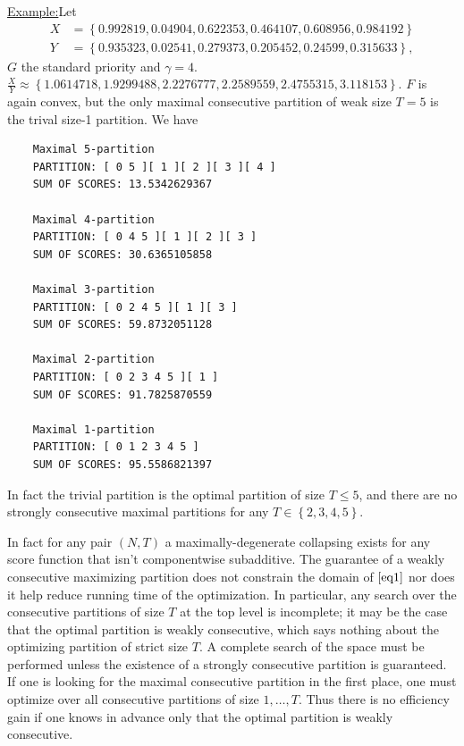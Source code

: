 \documentclass{article}
\theoremstyle{case}
\newenvironment{example}[1]{\par\noindent\underline{Example:}\space#1}{}
\begin{document}
\begin{example}
Let 
\begin{align*}
X & = \left\lbrace 0.992819, 0.04904, 0.622353, 0.464107, 0.608956, 0.984192 \right\rbrace \\
Y & = \left\lbrace 0.935323, 0.02541, 0.279373, 0.205452, 0.24599, 0.315633 \right\rbrace,
\end{align*}
$G$ the standard priority and $\gamma = 4$. $\frac{X}{Y} \approx \left\lbrace 1.0614718, 1.9299488, 2.2276777, 2.2589559, 2.4755315, 3.118153 \right\rbrace$. $F$ is again convex, but the only maximal consecutive partition of weak size $T = 5$ is the trival size-1 partition. We have

\begin{verbatim}
    Maximal 5-partition
    PARTITION: [ 0 5 ][ 1 ][ 2 ][ 3 ][ 4 ]
    SUM OF SCORES: 13.5342629367

    Maximal 4-partition
    PARTITION: [ 0 4 5 ][ 1 ][ 2 ][ 3 ]
    SUM OF SCORES: 30.6365105858

    Maximal 3-partition
    PARTITION: [ 0 2 4 5 ][ 1 ][ 3 ]
    SUM OF SCORES: 59.8732051128

    Maximal 2-partition
    PARTITION: [ 0 2 3 4 5 ][ 1 ]
    SUM OF SCORES: 91.7825870559

    Maximal 1-partition
    PARTITION: [ 0 1 2 3 4 5 ]
    SUM OF SCORES: 95.5586821397
\end{verbatim}
In fact the trivial partition is the optimal partition of size $T \leq 5$, and there are no strongly consecutive maximal partitions for any $T \in \left\lbrace 2, 3, 4, 5\right\rbrace$.

\end{example}
In fact for any pair $\left( N, T\right)$ a maximally-degenerate collapsing exists for any score function that isn't componentwise subadditive. The guarantee of a weakly consecutive maximizing partition does not constrain the domain of $\cite{eq1}$ nor does it help reduce running time of the optimization. In particular, any search over the consecutive partitions of size $T$ at the top level is incomplete; it may be the case that the optimal partition is weakly consecutive, which says nothing about the optimizing partition of strict size $T$. A complete search of the space must be performed unless the existence of a strongly consecutive partition is guaranteed. If one is looking for the maximal consecutive partition in the first place, one must optimize over all consecutive partitions of size $1, \dots, T$. Thus there is no efficiency gain if one knows in advance only that the optimal partition is weakly consecutive. 
\end{document}
